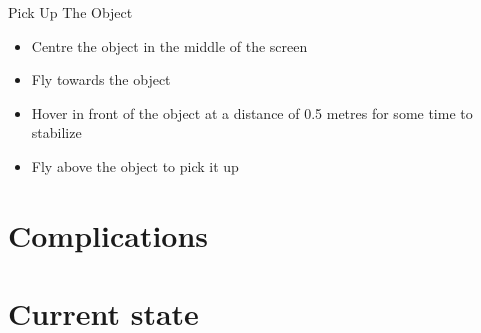 \documentclass{beamer}
\newcommand{\slide}[2]
{
\begin{frame}
\begin{block}{#1} 

#2

\end{block} \end{frame}
}
\begin{document}
\slide{Pick Up The Object}{
\begin{itemize}
    \item Centre the object in the middle of the screen
    \item Fly towards the object
    \item Hover in front of the object at a distance of 0.5 metres for some time to stabilize
    \item Fly above the object to pick it up
\end{itemize}
}

\section{Complications}
\section{Current state} %
\end{document}
